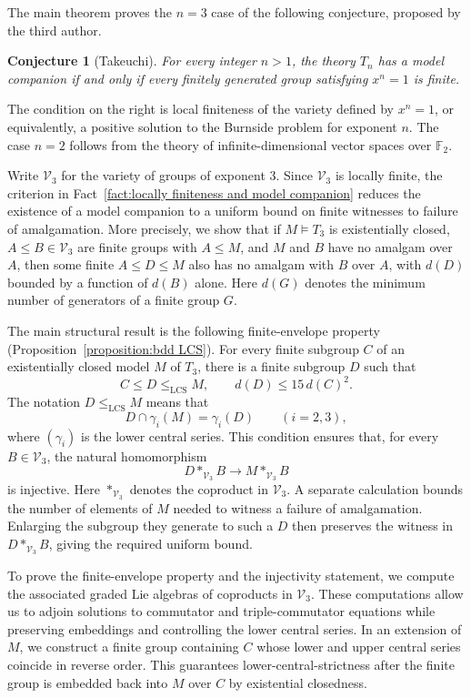 \documentclass[11pt,reqno]{article}
\newtheorem*{conjecture*}{Conjecture}
\theoremstyle{definition}
\theoremstyle{remark}
\newcommand{\LCS}{\mathrm{LCS}}
\begin{document}
The main theorem proves the $n=3$ case of the following conjecture,
proposed by the third author.

\begin{conjecture*}[Takeuchi]
For every integer $n>1$, the theory $T_n$ has a model companion if and
only if every finitely generated group satisfying $x^n=1$ is finite.
\end{conjecture*}

The condition on the right is local finiteness of the variety defined
by $x^n=1$, or equivalently, a positive solution to the Burnside
problem for exponent $n$. The case $n=2$ follows from the theory of
infinite-dimensional vector spaces over $\mathbb F_2$.

Write $\mathcal V_3$ for the variety of groups of exponent $3$.
Since $\mathcal V_3$ is locally finite, the criterion in
Fact~\ref{fact:locally finiteness and model companion} reduces the
existence of a model companion to a uniform bound on finite witnesses
to failure of amalgamation. More precisely, we show that if
$M\models T_3$ is existentially closed, $A\leq B\in\mathcal V_3$
are finite groups with $A\leq M$, and $M$ and $B$ have no amalgam
over $A$, then some finite $A\leq D\leq M$ also has no amalgam
with $B$ over $A$, with $d(D)$ bounded by a function of $d(B)$
alone. Here $d(G)$ denotes the minimum number of generators
of a finite group $G$.

The main structural result is the following finite-envelope property
(Proposition~\ref{proposition:bdd LCS}). For every finite subgroup $C$
of an existentially closed model $M$ of $T_3$, there is a finite
subgroup $D$ such that
\[
    C\leq D\leq_{\LCS}M,
    \qquad d(D)\leq15\,d(C)^2.
\]
The notation $D\leq_{\LCS}M$ means that
\[
    D\cap\gamma_i(M)=\gamma_i(D)\qquad(i=2,3),
\]
where $(\gamma_i)$ is the lower central series.
This condition ensures that, for every $B\in\mathcal V_3$, the natural
homomorphism
\[
    D*_{\mathcal V_3}B\longrightarrow M*_{\mathcal V_3}B
\]
is injective. Here $*_{\mathcal V_3}$ denotes the coproduct in
$\mathcal V_3$. A separate calculation bounds the number of elements
of $M$ needed to witness a failure of amalgamation. Enlarging the
subgroup they generate to such a $D$ then preserves the witness in
$D*_{\mathcal V_3}B$, giving the required uniform bound.

To prove the finite-envelope property and the injectivity statement,
we compute the associated graded Lie algebras of coproducts in
$\mathcal V_3$. These computations allow us to adjoin solutions to
commutator and triple-commutator equations while preserving embeddings
and controlling the lower central series. In an extension of $M$,
we construct a finite group containing $C$ whose lower and upper
central series coincide in reverse order.
This guarantees lower-central-strictness after the finite group is
embedded back into $M$ over $C$ by existential closedness.
\end{document}
